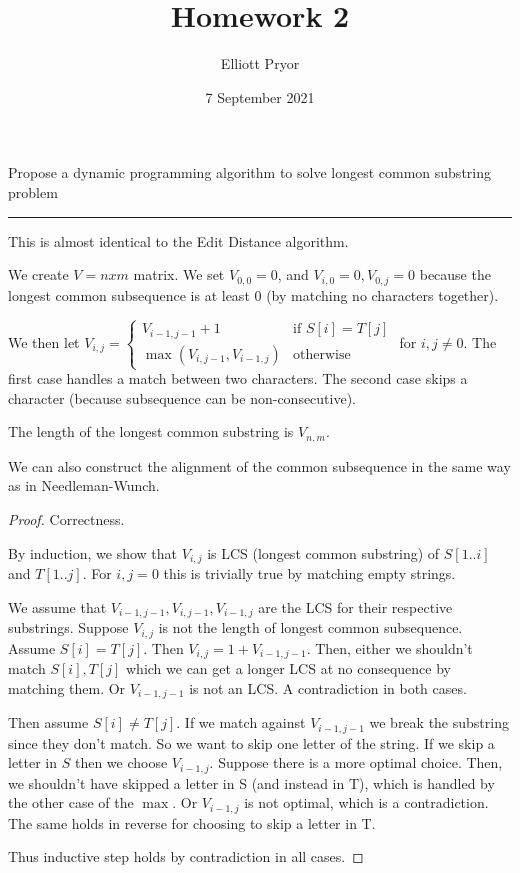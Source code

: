 \documentclass[11pt]{article}
\title{Homework 2}
\author{Elliott Pryor}
\date{7 September 2021}
\begin{document}
\maketitle


Propose a dynamic programming algorithm to solve longest common substring problem
\hrule

This is almost identical to the Edit Distance algorithm.

We create $V = nxm$ matrix. We set $V_{0,0} = 0$, and $V_{i,0} = 0, V_{0,j} = 0$ because the longest common subsequence
is at least 0 (by matching no characters together).

We then let $V_{i,j} = \begin{cases}
    V_{i-1, j-1} + 1 & \text{if } S[i] = T[j]\\
    \max(V_{i, j-1}, V_{i-1, j}) & \text{otherwise}
\end{cases}$ for $i,j \neq 0$.
The first case handles a match between two characters.
The second case skips a character (because subsequence can be non-consecutive).

The length of the longest common substring is $V_{n,m}$.

We can also construct the alignment of the common subsequence in the same way as in Needleman-Wunch.


\begin{proof}
    Correctness.
    
    By induction, we show that $V_{i,j}$ is LCS (longest common substring) of $S[1..i]$ and $T[1..j]$.
    For $i, j = 0$ this is trivially true by matching empty strings.
    
    
    We assume that $V_{i-1, j-1}, V_{i, j-1}, V_{i-1, j}$ are the LCS for their respective substrings.
    Suppose $V_{i,j}$ is not the length of longest common subsequence.
    Assume $S[i] = T[j]$. Then $V_{i,j} = 1 +  V_{i-1, j-1}$. 
    Then, either we shouldn't match $S[i], T[j]$ which we can get a longer LCS at no consequence by matching them.
    Or $V_{i-1, j-1}$ is not an LCS. A contradiction in both cases.

    Then assume $S[i] \neq T[j]$. If we match against $V_{i-1, j-1}$ we break the substring since they don't match.
    So we want to skip one letter of the string. If we skip a letter in $S$ then we choose $V_{i-1, j}$.
    Suppose there is a more optimal choice. Then, we shouldn't have skipped a letter in S (and instead in T), which is handled
    by the other case of the $\max$. Or $V_{i-1, j}$ is not optimal, which is a contradiction.
    The same holds in reverse for choosing to skip a letter in T. 

    Thus inductive step holds by contradiction in all cases.

\end{proof}
\end{document}
